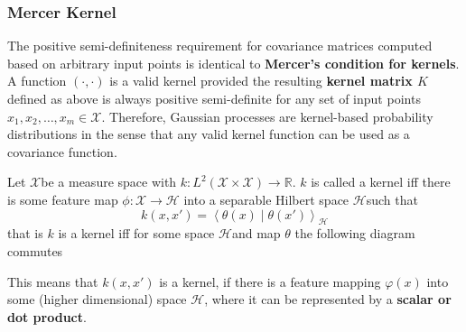 \documentclass[11pt]{article}
\theoremstyle{definition}
\newcommand*\R{\mathbb{R}}
\newcommand*\X{\ensuremath{\mathcal{X}}}
\newcommand*\Hilbert{\ensuremath{\mathcal{H}}}
\begin{document}
\subsubsection{Mercer Kernel}
The positive semi-definiteness requirement for covariance matrices computed based on arbitrary input points is identical to \textbf{Mercer's condition for kernels}. A function $(\cdot,\cdot)$ is a valid kernel provided the resulting \textbf{kernel matrix $K$} defined as above is always positive semi-definite for any set of input points $x_1, x_2, \dots, x_m \in \X$. Therefore, Gaussian processes are kernel-based probability distributions in the sense that any valid kernel function can be used as a covariance function.
\begin{definition}
	Let \X be a measure space with $k: L^2(\X\times\X)\rightarrow \R$. $k$ is called a kernel iff there is some feature map $\phi: \X \rightarrow \Hilbert$ into a separable Hilbert space \Hilbert such that
	\begin{equation*}
		k(x,x') = \left\langle \theta(x) \middle| \theta(x') \right\rangle_{\Hilbert}
	\end{equation*}
	that is $k$ is a kernel iff for some space \Hilbert and map $\theta$ the following diagram commutes
	\begin{center}
	\end{center}
	This means that $k(x,x')$ is a kernel, if there is a feature mapping $\varphi(x)$ into some (higher dimensional) space \Hilbert, where it can be represented by a \textbf{scalar or dot product}.
\end{definition}
\end{document}
